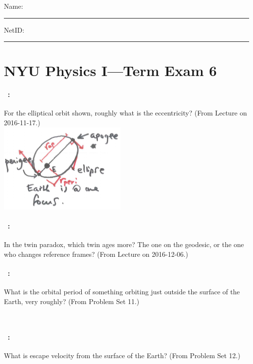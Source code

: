 \documentclass[12pt]{article} 
\begin{document}
\noindent
Name: \rule[-1ex]{0.55\textwidth}{0.1pt}
NetID: \rule[-1ex]{0.2\textwidth}{0.1pt}

\section*{NYU Physics I---Term Exam 6}

\paragraph{\problemname~\theproblem:}%
For the elliptical orbit shown, roughly what is the eccentricity?
(From Lecture on 2016-11-17.)\\
\includegraphics[width=2.5in]{./ellipse.png}

\vfill

\paragraph{\problemname~\theproblem:}%
In the twin paradox, which twin ages more? The one on the geodesic, or
the one who changes reference frames? (From Lecture on 2016-12-06.)

\vfill

\paragraph{\problemname~\theproblem:}%
What is the orbital period of something orbiting just outside the
surface of the Earth, very roughly? (From Problem Set 11.)

\vfill
~
\clearpage

\paragraph{\problemname~\theproblem:}%
What is escape velocity from the surface of the Earth? (From Problem
Set 12.)

\vfill
\end{document}
